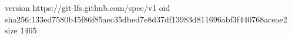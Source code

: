 version https://git-lfs.github.com/spec/v1
oid sha256:133ed7580b45f86f85aec35dbed7e8d37df13983d811696abf3f440768aceae2
size 1465
